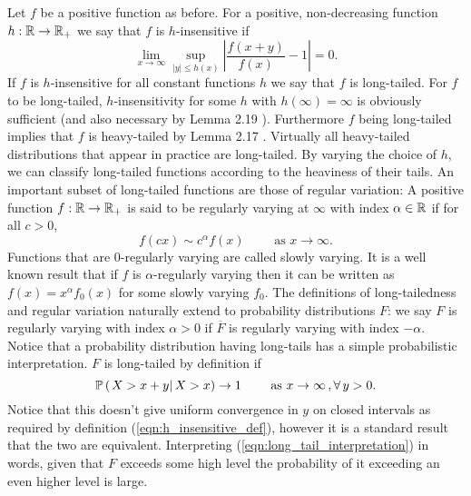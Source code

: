 Let $f$ be a positive function as before. For a positive, non-decreasing function $h:\mathbb{R} \to \mathbb{R}_+$ we say that $f$ is $h$-insensitive if 
\begin{equation}\label{eqn:h_insensitive_def}
\lim\limits_{x \to \infty} \sup\limits_{|y| \leq h(x)} \left\lvert \frac{f(x+y)}{f(x)} - 1 \right\rvert = 0. 
\end{equation}
If $f$ is $h$-insensitive for all constant functions $h$ we say that $f$ is long-tailed. For $f$ to be long-tailed, $h$-insensitivity for some $h$ with $h(\infty) = \infty$ is obviously sufficient (and also necessary by Lemma 2.19 \cite{foss2011introduction}). Furthermore $f$ being long-tailed implies that $f$ is heavy-tailed by Lemma 2.17 \cite{foss2011introduction}. Virtually all heavy-tailed distributions that appear in practice are long-tailed. By varying the choice of $h$, we can classify long-tailed functions according to the heaviness of their tails. An important subset of long-tailed functions are those of regular variation: A positive function $f:\mathbb{R} \to \mathbb{R}_+$ is said to be regularly varying at $\infty$ with index $\alpha \in \mathbb{R}$ if for all $c > 0$, 
\begin{equation}
f(cx) \sim c^\alpha f(x) \qquad\text{ as } x \to \infty. 
\end{equation}
Functions that are $0$-regularly varying are called slowly varying. It is a well known result that if $f$ is $\alpha$-regularly varying then it can be written as $f(x) = x^\alpha f_0(x)$ for some slowly varying $f_0$. The definitions of long-tailedness and regular variation naturally extend to probability distributions $F$: we say $F$ is regularly varying with index $\alpha > 0$ if $\overline{F}$ is regularly varying with index $- \alpha$. Notice that a probability distribution having long-tails has a simple probabilistic interpretation. $F$ is long-tailed by definition if 
\begin{equation}\label{eqn:long_tail_interpretation}
\mathbb{P} \left( \left. X > x + y \right| X > x \right) \to 1 \qquad\text{ as } x \to \infty\,, \forall\, y > 0. 
\end{equation}
Notice that this doesn't give uniform convergence in $y$ on closed intervals as required by definition (\ref{eqn:h_insensitive_def}), however it is a standard result that the two are equivalent. Interpreting (\ref{eqn:long_tail_interpretation}) in words, given that $F$ exceeds some high level the probability of it exceeding an even higher level is large. 



